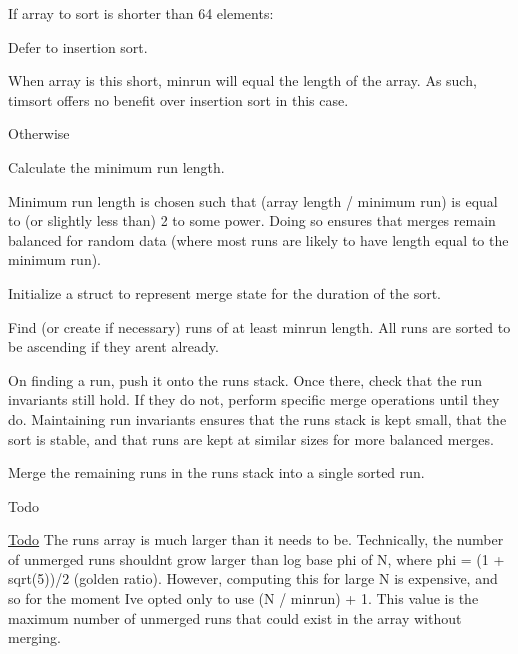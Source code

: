 \begin{DoxyItemize}
\item If array to sort is shorter than 64 elements\+:
\begin{DoxyEnumerate}
\item Defer to insertion sort.
\begin{DoxyItemize}
\item When array is this short, minrun will equal the length of the array. As such, timsort offers no benefit over insertion sort in this case.
\end{DoxyItemize}
\end{DoxyEnumerate}
\item Otherwise
\begin{DoxyEnumerate}
\item Calculate the minimum run length.
\begin{DoxyItemize}
\item Minimum run length is chosen such that (array length / minimum run) is equal to (or slightly less than) 2 to some power. Doing so ensures that merges remain balanced for random data (where most runs are likely to have length equal to the minimum run).
\end{DoxyItemize}
\item Initialize a struct to represent merge state for the duration of the sort.
\item Find (or create if necessary) runs of at least minrun length. All runs are sorted to be ascending if they aren\textquotesingle{}t already.
\begin{DoxyItemize}
\item On finding a run, push it onto the runs stack. Once there, check that the run invariants still hold. If they do not, perform specific merge operations until they do. Maintaining run invariants ensures that the runs stack is kept small, that the sort is stable, and that runs are kept at similar sizes for more balanced merges.
\end{DoxyItemize}
\item Merge the remaining runs in the runs stack into a single sorted run.
\end{DoxyEnumerate}
\end{DoxyItemize}

\begin{DoxyRefDesc}{Todo}
\item[\hyperlink{todo__todo000001}{Todo}]The runs array is much larger than it needs to be. Technically, the number of unmerged runs shouldn\textquotesingle{}t grow larger than log base phi of N, where phi = (1 + sqrt(5))/2 (golden ratio). However, computing this for large N is expensive, and so for the moment I\textquotesingle{}ve opted only to use (N / minrun) + 1. This value is the maximum number of unmerged runs that could exist in the array without merging. \end{DoxyRefDesc}



